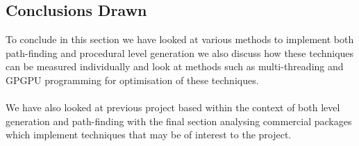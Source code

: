 \subsection{Conclusions Drawn}
To conclude in this section we have looked at various methods to implement both path-finding and procedural level generation we also discuss how these techniques can be measured individually and look at methods such as multi-threading and GPGPU programming for optimisation of these techniques.\\\\We have also looked at previous project based within the context of both level generation and path-finding with the final section analysing commercial packages which implement techniques that may be of interest to the project.  
\pagebreak


